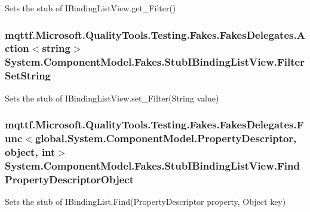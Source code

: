 Sets the stub of I\-Binding\-List\-View.\-get\-\_\-\-Filter()

\hypertarget{class_system_1_1_component_model_1_1_fakes_1_1_stub_i_binding_list_view_aea0897a6bdcd192d65ac05dd90e648c1}{
\subsubsection[{Filter\-Set\-String}]{\setlength{\rightskip}{0pt plus 5cm}mqttf.\-Microsoft.\-Quality\-Tools.\-Testing.\-Fakes.\-Fakes\-Delegates.\-Action$<$string$>$ System.\-Component\-Model.\-Fakes.\-Stub\-I\-Binding\-List\-View.\-Filter\-Set\-String}}\label{class_system_1_1_component_model_1_1_fakes_1_1_stub_i_binding_list_view_aea0897a6bdcd192d65ac05dd90e648c1}


Sets the stub of I\-Binding\-List\-View.\-set\-\_\-\-Filter(\-String value)

\hypertarget{class_system_1_1_component_model_1_1_fakes_1_1_stub_i_binding_list_view_afe0557454b681acf6314780fa15c96dc}{
\subsubsection[{Find\-Property\-Descriptor\-Object}]{\setlength{\rightskip}{0pt plus 5cm}mqttf.\-Microsoft.\-Quality\-Tools.\-Testing.\-Fakes.\-Fakes\-Delegates.\-Func$<$global.\-System.\-Component\-Model.\-Property\-Descriptor, object, int$>$ System.\-Component\-Model.\-Fakes.\-Stub\-I\-Binding\-List\-View.\-Find\-Property\-Descriptor\-Object}}\label{class_system_1_1_component_model_1_1_fakes_1_1_stub_i_binding_list_view_afe0557454b681acf6314780fa15c96dc}


Sets the stub of I\-Binding\-List.\-Find(\-Property\-Descriptor property, Object key)


